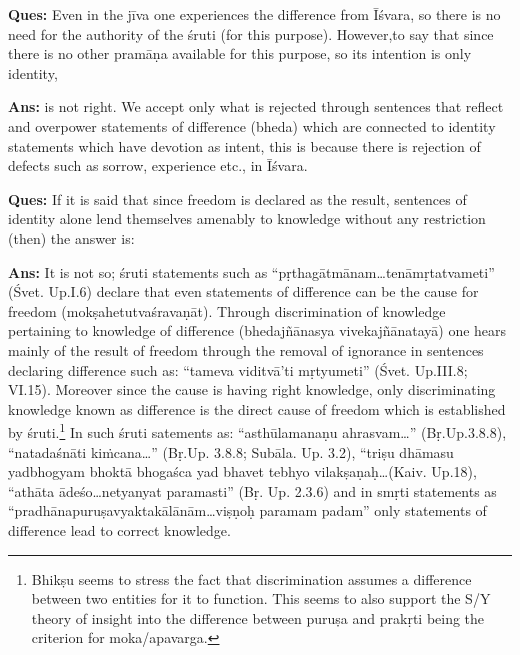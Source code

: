 \textbf{Ques:} Even in the jīva one experiences the difference from Īśvara, so there is no need for the authority of the śruti (for this purpose).  However,to say that  since there is no other pramāṇa available for this purpose, so its intention is only identity,

\textbf{Ans:} is not right. We accept only what is rejected through sentences that reflect and overpower statements of difference (bheda) which are connected to identity statements which have devotion as intent, this is because there is rejection of defects such as sorrow, experience etc., in Īśvara.

\textbf{Ques:} If it is said that since freedom is declared as the result, sentences of identity alone lend themselves amenably to knowledge without any restriction (then) the answer is: 

\textbf{Ans:} It is not so; śruti statements such as “pṛthagātmānam…tenāmṛ\-tatvameti” (Śvet. Up.I.6) declare that even statements of difference can be the cause for freedom (mokṣahetutvaśravaṇāt). Through discrimination of knowledge pertaining to knowledge of difference (bhedajñānasya vivekajñānatayā) one hears mainly of the result of freedom through the removal of ignorance in sentences declaring difference such as: “tameva viditvā’ti mṛtyumeti” (Śvet. Up.III.8; VI.15). Moreover  since the cause  is having right knowledge, only discriminating knowledge known as difference is the direct cause of freedom which is established by śruti.\footnote{Bhikṣu seems to stress the fact that discrimination assumes a difference between two entities for it to function. This seems to also support the S/Y theory of insight into the difference between puruṣa and prakṛti being the criterion for moka/apavarga.} In such śruti satements as: “asthūlamanaṇu ahrasvam…” (Bṛ.Up.3.8.8), “natadaśnāti kiṁcana…” (Bṛ.Up. 3.8.8; Subāla. Up. 3.2), “triṣu dhāmasu yadbhogyam bhoktā bhogaśca yad bhavet tebhyo vilakṣaṇaḥ…(Kaiv. Up.18), “athāta ādeśo…netyanyat paramasti” (Bṛ. Up. 2.3.6) and in smṛti statements as “pradhānapuruṣavyaktakālānām…viṣṇoḥ paramam padam” only statements of difference lead to correct knowledge. 


